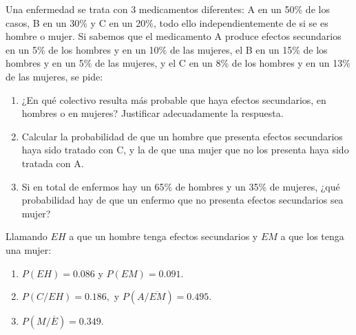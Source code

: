 {Una enfermedad se trata con 3 medicamentos diferentes: A en un 50\% de los casos, B en un 30\% y C en un 20\%, todo
ello independientemente de si se es hombre o mujer.
Si sabemos que el medicamento A produce efectos secundarios en un 5\% de los hombres y en un 10\% de las mujeres, el B
en un 15\% de los hombres y en un 5\% de las mujeres, y el C en un 8\% de los hombres y en un 13\% de las mujeres, se pide:
\begin{enumerate}
\item ¿En qué colectivo resulta más probable que haya efectos secundarios, en hombres o en mujeres?
Justificar adecuadamente la respuesta.
\item Calcular la probabilidad de que un hombre que presenta efectos secundarios haya sido tratado con C, y la de que
una mujer que no los presenta haya sido tratada con A.
\item Si en total de enfermos hay un 65\% de hombres y un 35\% de mujeres, ¿qué probabilidad hay de que un enfermo que
no presenta efectos secundarios sea mujer?
\end{enumerate}
}
{Llamando $EH$ a que un hombre tenga efectos secundarios y $EM$ a que los tenga una mujer:
\begin{enumerate}
\item $P(EH)=0.086$ y $P(EM)=0.091$.
\item $P(C/EH)=0.186,$ y $P(A/\overline{EM})=0.495$.
\item $P(M/\overline E )= 0.349$.
\end{enumerate}
}
